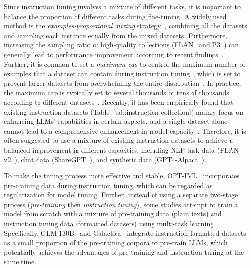 Since instruction tuning involves a mixture of different tasks, it is important to balance the proportion of different tasks during fine-tuning. A widely used method is the \emph{examples-proportional mixing} strategy~\cite{Raffel-JMLR-2020-Exploring}, \ie combining all the datasets and sampling each instance equally from the mixed datasets. Furthermore, increasing the sampling ratio of high-quality collections (\eg FLAN~\cite{Wei-ICLR-2022-Finetuned} and P3~\cite{Bach-ACL-2022-PromptSource}) can generally lead to performance improvement according to recent findings~\cite{Chung-arxiv-2022-Scaling,Iyer-arxiv-2022-OPT}. Further, it is common to set a \emph{maximum cap} to control the maximum number of examples that  a dataset can contain during instruction tuning~\cite{Raffel-JMLR-2020-Exploring}, which is set to prevent larger datasets from overwhelming the entire distribution~\cite{Raffel-JMLR-2020-Exploring,Iyer-arxiv-2022-OPT}. In practice, the maximum cap is typically set to several thousands or tens of thousands according to different datasets~\cite{Wei-ICLR-2022-Finetuned,Chung-arxiv-2022-Scaling}. 
{Recently, it has been 
empirically found  that existing instruction datasets (Table~\ref{tab:instruction-collection}) mainly focus on  enhancing LLMs' capabilities in certain aspects,  
and a single dataset alone cannot lead to a comprehensive enhancement in model capacity~\cite{Wang-arxiv-2023-How}. Therefore, it is often  suggested to use a mixture of existing instruction datasets to achieve a balanced improvement in different capacities, including NLP task data (\eg FLAN v2~\cite{Liu-arxiv-2023_scaling}), chat data (\eg ShareGPT~\cite{ShareGPT}), and synthetic data (\eg GPT4-Alpaca~\cite{Peng-23-arxiv-Instruction}).}






To make the tuning process more effective and stable, OPT-IML~\cite{Iyer-arxiv-2022-OPT} incorporates pre-training data during instruction tuning, which can be regarded as regularization for model tuning. 
{Further, instead of using a separate two-stage process (\emph{pre-training} then \emph{instruction tuning}), some studies  attempt to train a model from scratch with a mixture of pre-training data (\ie plain texts) and instruction tuning data (\ie formatted  datasets)} using multi-task learning~\cite{Raffel-JMLR-2020-Exploring}. Specifically, GLM-130B~\cite{Zeng-arxiv-2022-GLM} and Galactica~\cite{Taylor-arxiv-2022-Galactica} integrate instruction-formatted datasets as a small proportion of the pre-training corpora to pre-train LLMs, which potentially achieves the advantages of pre-training and instruction tuning at the same time. 


